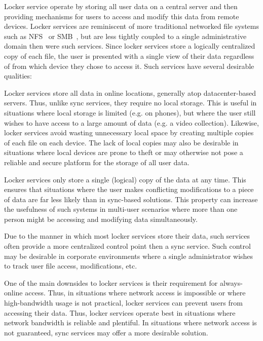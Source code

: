 Locker service operate by storing all user data on a central server
and then providing mechanisms for users to access and modify this data
from remote devices. Locker services are reminiscent of more
traditional networked file systems such as NFS~\cite{sandberg1985} or
SMB~\cite{microsoft-smb2}, but are less tightly coupled to a single
administrative domain then were such services. Since locker services
store a logically centralized copy of each file, the user is presented
with a single view of their data regardless of from which device they
chose to access it. Such services have several desirable qualities:

\begin{packed_desc}
\item[No Local Storage:] Locker services store all data in online
  locations, generally atop datacenter-based servers. Thus, unlike
  sync services, they require no local storage. This is useful in
  situations where local storage is limited (e.g. on phones), but
  where the user still wishes to have access to a large amount of data
  (e.g. a video collection). Likewise, locker services avoid wasting
  unnecessary local space by creating multiple copies of each file on
  each device. The lack of local copies may also be desirable in
  situations where local devices are prone to theft or may otherwise
  not pose a reliable and secure platform for the storage of all user
  data.
\item[Single Source of Truth:] Locker services only store a single
  (logical) copy of the data at any time. This ensures that situations
  where the user makes conflicting modifications to a piece of data
  are far less likely than in sync-based solutions. This property can
  increase the usefulness of such systems in multi-user scenarios
  where more than one person might be accessing and modifying data
  simultaneously.
\item[Centralized Control:] Due to the manner in which most locker
  services store their data, such services often provide a more
  centralized control point then a sync service. Such control may be
  desirable in corporate environments where a single administrator
  wishes to track user file access, modifications, etc.
\end{packed_desc}

One of the main downsides to locker services is their requirement for
always-online access. Thus, in situations where network access is
impossible or where high-bandwidth usage is not practical, locker
services can prevent users from accessing their data. Thus, locker
services operate best in situations where network bandwidth is
reliable and plentiful. In situations where network access is not
guaranteed, sync services may offer a more desirable solution.

